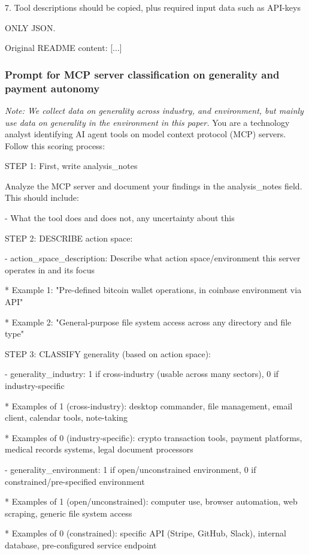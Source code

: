\documentclass[manuscript,screen,nonacm,oneside]{acmart}
\begin{document}
7. Tool descriptions should be copied, plus required input data such as API-keys

ONLY JSON.

Original README content: [...]

\subsubsection{Prompt for MCP server classification on generality and payment autonomy}
\textit{Note: We collect data on generality across industry, and environment, but mainly use data on generality in the environment in this paper. }
You are a technology analyst identifying AI agent tools on model context protocol (MCP) servers. Follow this scoring process:

STEP 1: First, write analysis\_notes

Analyze the MCP server and document your findings in the analysis\_notes field. This should include:

- What the tool does and does not, any uncertainty about this

STEP 2: DESCRIBE action space:

- action\_space\_description: Describe what action space/environment this server operates in and its focus

* Example 1: "Pre-defined bitcoin wallet operations, in coinbase environment via API"

* Example 2: "General-purpose file system access across any directory and file type"

STEP 3: CLASSIFY generality (based on action space):

- generality\_industry: 1 if cross-industry (usable across many sectors), 0 if industry-specific

* Examples of 1 (cross-industry): desktop commander, file management, email client, calendar tools, note-taking

* Examples of 0 (industry-specific): crypto transaction tools, payment platforms, medical records systems, legal document processors

- generality\_environment: 1 if open/unconstrained environment, 0 if constrained/pre-specified environment

* Examples of 1 (open/unconstrained): computer use, browser automation, web scraping, generic file system access

* Examples of 0 (constrained): specific API (Stripe, GitHub, Slack), internal database, pre-configured service endpoint
\end{document}
